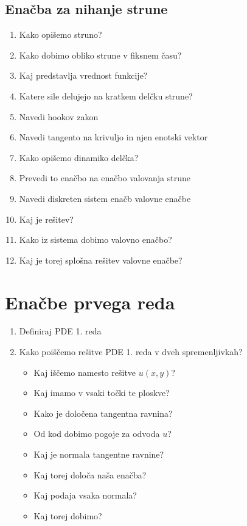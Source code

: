 \documentclass{article}
\begin{document}
    \subsection{Enačba za nihanje strune}
    \begin{enumerate}
        \item Kako opišemo struno?
        \item Kako dobimo obliko strune v fiksnem času?
        \item Kaj predstavlja vrednost funkcije?
        \item Katere sile delujejo na kratkem delčku strune?
        \item Navedi hookov zakon
        \item Navedi tangento na krivuljo in njen enotski vektor
        \item Kako opišemo dinamiko delčka?
        \item Prevedi to enačbo na enačbo valovanja strune
        \item Navedi diskreten sistem enačb valovne enačbe 
        \item Kaj je rešitev?
        \item Kako iz sistema dobimo valovno enačbo?
        \item Kaj je torej splošna rešitev valovne enačbe?
    \end{enumerate}

    \section{Enačbe prvega reda}
    \begin{enumerate}
        \item Definiraj PDE 1. reda
        \item Kako poiščemo rešitve PDE 1. reda v dveh spremenljivkah?
        \begin{itemize}
            \item Kaj iščemo namesto rešitve $u(x, y)$?
            \item Kaj imamo v vsaki točki te ploskve?
            \item Kako je določena tangentna ravnina?
            \item Od kod dobimo pogoje za odvoda $u$?
            \item Kaj je normala tangentne ravnine?
            \item Kaj torej določa naša enačba?
            \item Kaj podaja vsaka normala?
            \item Kaj torej dobimo?
        \end{itemize}
    \end{enumerate}
\end{document}
